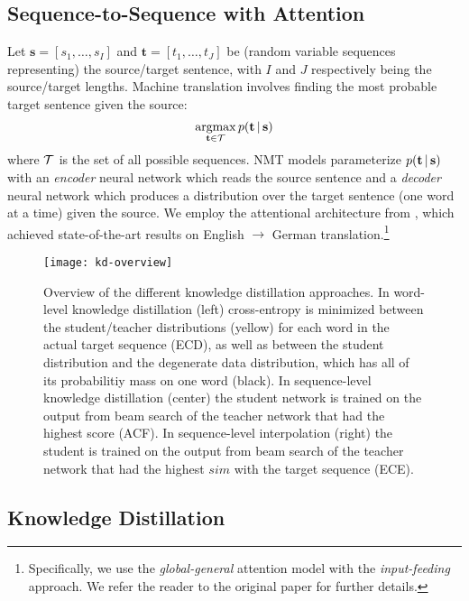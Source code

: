 \documentclass[11pt,letterpaper]{article}
\DeclareMathOperator*{\argmax}{argmax}
\begin{document}
\subsection{Sequence-to-Sequence with Attention}\label{NMT}
Let $\mathbf{s} = [s_1, \dots, s_I]$ and $\mathbf{t} = [t_1, \dots, t_J]$ be 
 (random variable sequences representing) the source/target sentence, 
with $I$ and $J$ respectively being the source/target lengths. Machine translation
involves finding the most probable target sentence given the source: 
\begin{equation*}
\argmax_{\tvec \in \mcT} p(\tvec \given \svec)
\end{equation*}
where $\mathcal{T}$ is the set of all possible sequences.
NMT models parameterize $p(\mathbf{t}\,|\,\mathbf{s})$ 
with an \textit{encoder} neural network which reads the source sentence and a \textit{decoder}
neural network which produces a distribution over the target sentence (one word at a time) given the source. 
We employ the attentional architecture from 
, which achieved state-of-the-art results on English $\rightarrow$
German translation.\footnote{Specifically, we use the \textit{global-general} attention model
with the \textit{input-feeding} approach. We refer the reader to the original paper for further details.}







\begin{figure*}[htp]\label{fig1}
\centering
\texttt{[image: kd-overview]}
\caption{Overview of the different knowledge distillation approaches.
In word-level knowledge distillation (left) cross-entropy is minimized between the
  student/teacher distributions (yellow) for each word in the actual target sequence (\textsf{ECD}), as well as
  between the student distribution and the degenerate data distribution, which has all of its
  probabilitiy mass on one word (black). In sequence-level knowledge distillation (center)
  the student network is trained on the output from beam search of the teacher network that
  had the highest score (\textsf{ACF}). In sequence-level interpolation (right) the student is trained on the output
 from beam search of the teacher network that had the highest $sim$ with the target sequence (\textsf{ECE}).}
\end{figure*}
\subsection{Knowledge Distillation}\label{KD}
\end{document}
